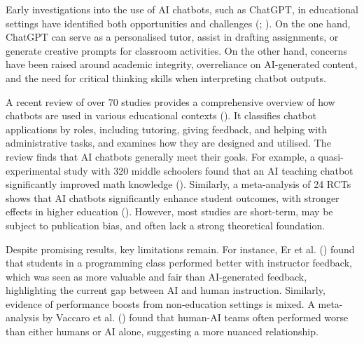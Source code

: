 \documentclass[
  12pt,
]{article}
\begin{document}
Early investigations into the use of AI chatbots, such as ChatGPT, in educational settings have identified both opportunities and challenges (; ). On the one hand, ChatGPT can serve as a personalised tutor, assist in drafting assignments, or generate creative prompts for classroom activities. On the other hand, concerns have been raised around academic integrity, overreliance on AI-generated content, and the need for critical thinking skills when interpreting chatbot outputs.

A recent review of over 70 studies provides a comprehensive overview of how chatbots are used in various educational contexts (). It classifies chatbot applications by roles, including tutoring, giving feedback, and helping with administrative tasks, and examines how they are designed and utilised. The review finds that AI chatbots generally meet their goals. For example, a quasi-experimental study with 320 middle schoolers found that an AI teaching chatbot significantly improved math knowledge (). Similarly, a meta-analysis of 24 RCTs shows that AI chatbots significantly enhance student outcomes, with stronger effects in higher education (). However, most studies are short-term, may be subject to publication bias, and often lack a strong theoretical foundation.

Despite promising results, key limitations remain. For instance, Er et al. () found that students in a programming class performed better with instructor feedback, which was seen as more valuable and fair than AI-generated feedback, highlighting the current gap between AI and human instruction. Similarly, evidence of performance boosts from non-education settings is mixed. A meta-analysis by Vaccaro et al. () found that human-AI teams often performed worse than either humans or AI alone, suggesting a more nuanced relationship.
\end{document}
